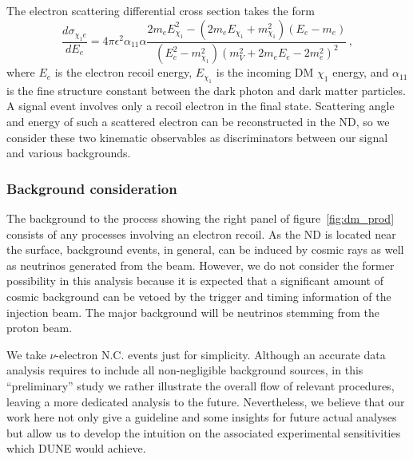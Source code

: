 The electron scattering differential cross section takes the form
\begin{equation}
\frac{d\sigma_{{\chi_1}e}}{dE_{e}} 
= 4\pi \epsilon^{2}\alpha_{11}\alpha \frac{2m_{e}E_{\chi_1}^{2} - (2m_{e}E_{\chi_1} + m_{\chi_1}^{2})(E_e-m_{e})}{(E_e^{2}-m_{\chi_1}^{2})(m_{V}^{2}+2m_{e}E_{e}-2m_{e}^{2})^{2}}\,,
\end{equation}
where $E_{e}$ is the electron recoil  energy, $E_{\chi_1}$ is the incoming DM $\chi_1$ energy, and $\alpha_{11}$ is the fine structure constant between the dark photon and dark matter particles.
A signal event involves only a recoil electron in the final state. Scattering angle and energy of such a scattered electron can be reconstructed in the ND, so we consider these two kinematic observables as discriminators between our signal and various backgrounds.
\subsubsection{Background consideration}
 The background to the process showing the right panel of figure~\ref{fig:dm_prod} consists of any processes involving an electron recoil. As the ND is located near the surface, background events, in general, can be induced by cosmic rays as well as neutrinos generated from the beam. However, we do not consider the former possibility in this analysis because it is expected that a significant amount of cosmic background can be vetoed by the trigger and timing information of the injection beam. 
The major background will be neutrinos stemming from the proton beam. 

We take $\nu$-electron N.C. events just for simplicity. 
Although an accurate data analysis requires to include all non-negligible background sources, in this ``preliminary'' study we rather illustrate the overall flow of relevant procedures, leaving a more dedicated analysis to the future.
Nevertheless, we believe that our work here  not only give a guideline and some insights for future actual analyses but allow us to develop the intuition on the associated experimental sensitivities which DUNE would achieve.
